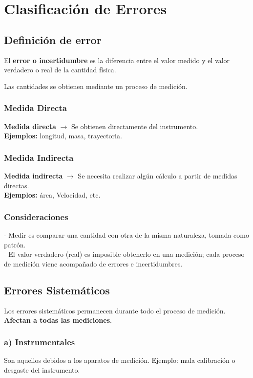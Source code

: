 \chapter{Clasificación de Errores}

\section{Definición de error}
El \textbf{error o incertidumbre} es la diferencia entre el valor medido y el valor verdadero o real de la cantidad física.

Las cantidades se obtienen mediante un proceso de medición.

\subsection{Medida Directa}
\noindent
\textbf{Medida directa} $\longrightarrow$ Se obtienen directamente del instrumento. \\
\textbf{Ejemplos:} longitud, masa, trayectoria.

\subsection{Medida Indirecta}
\noindent
\textbf{Medida indirecta} $\longrightarrow$ Se necesita realizar algún cálculo a partir de medidas directas. \\
\textbf{Ejemplos:} área, Velocidad, etc.

\subsection{Consideraciones}
- Medir es comparar una cantidad con otra de la misma naturaleza, tomada como patrón.\\
- El valor verdadero (real) es imposible obtenerlo en una medición; cada proceso de medición viene acompañado de errores e incertidumbres.

\newpage
\section{Errores Sistemáticos}

Los errores sistemáticos permanecen durante todo el proceso de medición. \textbf{Afectan a todas las mediciones}.

\subsection{a) Instrumentales}
Son aquellos debidos a los aparatos de medición.  
Ejemplo: mala calibración o desgaste del instrumento.

